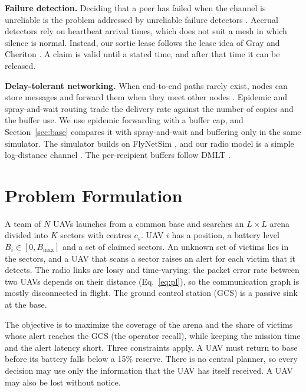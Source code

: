 \documentclass[conference]{IEEEtran}
\begin{document}
\textbf{Failure detection.} Deciding that a peer has failed when the channel is unreliable is the problem addressed by unreliable failure detectors \cite{chandra1996}. Accrual detectors \cite{hayashibara2004} rely on heartbeat arrival times, which does not suit a mesh in which silence is normal. Instead, our sortie lease follows the lease idea of Gray and Cheriton \cite{gray1989}. A claim is valid until a stated time, and after that time it can be released.

\textbf{Delay-tolerant networking.} When end-to-end paths rarely exist, nodes can store messages and forward them when they meet other nodes \cite{fall2003dtn}. Epidemic and spray-and-wait routing \cite{vahdat2000epidemic,spyropoulos2005spray} trade the delivery rate against the number of copies and the buffer use. We use epidemic forwarding with a buffer cap, and Section~\ref{sec:base} compares it with spray-and-wait and buffering only in the same simulator. The simulator builds on FlyNetSim \cite{baidya2018flynetsim}, and our radio model is a simple log-distance channel \cite{rappaport2002wireless}. The per-recipient buffers follow DMLT \cite{kosaka2023dmlt}.

\section{Problem Formulation}\label{sec:problem}
A team of $N$ UAVs launches from a common base and searches an $L\times L$ arena divided into $K$ sectors with centres $c_s$. UAV $i$ has a position, a battery level $B_i\in[0,B_{\max}]$ and a set of claimed sectors. An unknown set of victims lies in the sectors, and a UAV that scans a sector raises an alert for each victim that it detects. The radio links are lossy and time-varying: the packet error rate between two UAVs depends on their distance (Eq.~\ref{eq:pl}), so the communication graph is mostly disconnected in flight. The ground control station (GCS) is a passive sink at the base.

The objective is to maximize the coverage of the arena and the share of victims whose alert reaches the GCS (the operator recall), while keeping the mission time and the alert latency short. Three constraints apply. A UAV must return to base before its battery falls below a 15\% reserve. There is no central planner, so every decision may use only the information that the UAV has itself received. A UAV may also be lost without notice.
\end{document}
